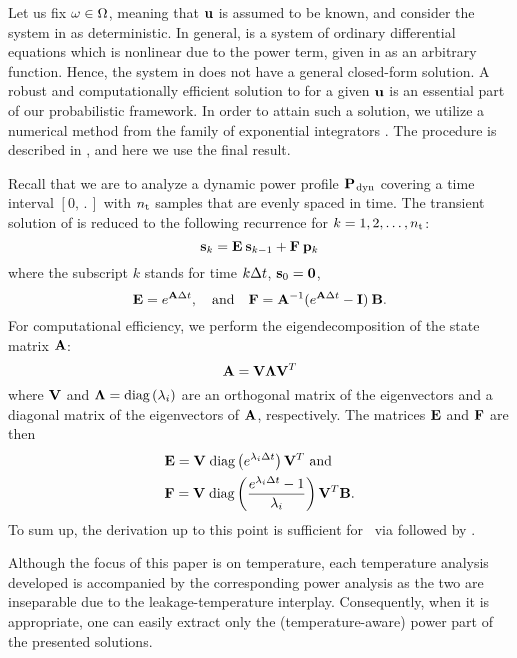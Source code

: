 Let us fix $\omega \in \Omega$, meaning that $\mathbf{u}$ is assumed to be known, and consider the system in  as deterministic.
In general,  is a system of ordinary differential equations which is nonlinear due to the power term, given in  as an arbitrary function.
Hence, the system in  does not have a general closed-form solution.
A robust and computationally efficient solution to  for a given $\mathbf{u}$ is an essential part of our probabilistic framework.
In order to attain such a solution, we utilize a numerical method from the family of exponential integrators \cite{hochbruck2010}.
The procedure is described in , and here we use the final result.

Recall that we are to analyze a dynamic power profile $\mathbf{P}_{\text{\kern0.1emdyn}}$ covering a time interval $[0, \period]$ with ${n_\text{t}}$ samples that are evenly spaced in time.
The transient solution of  is reduced to the following recurrence for $k = 1, 2, \dots, {n_\text{t}}$:
\begin{equation} \elab{recurrence}
  \vs_k = \mE \: \vs_{k - 1} + \mF \: \vp_k
\end{equation}
where the subscript $k$ stands for time $k \Delta t$, $\mathbf{s}_0 = \mathbf{0}$,
\[
  \mathbf{E} = e^{\mathbf{A} \Delta t}, \hspace{1em} \text{and} \hspace{1em} \mathbf{F} = \mathbf{A}^{-1} (e^{\mathbf{A} \Delta t} - \mathbf{I}) \: \mathbf{B}.
\]
For computational efficiency, we perform the eigendecomposition of the state matrix $\mathbf{A}$:
\begin{equation} \elab{eigendecomposition}
  \mA = \mEDV \mEDL \mEDV^T
\end{equation}
where $\mathbf{V}$ and $\mathbf{\Lambda} = \text{diag}\left( \lambda_i \right)$ are an orthogonal matrix of the eigenvectors and a diagonal matrix of the eigenvectors of $\mathbf{A}$, respectively.
The matrices $\mathbf{E}$ and $\mathbf{F}$ are then
\begin{align*}
  & \mathbf{E} = \mathbf{V} \; \text{diag}\left( e^{\lambda_i \Delta t} \right) \mathbf{V}^T \text{ and} \\
  & \mathbf{F} = \mathbf{V} \; \text{diag}\left(  \frac{e^{\lambda_i \Delta t} - 1}{\lambda_i}  \right) \mathbf{V}^T \mathbf{B}.
\end{align*}
To sum up, the derivation up to this point is sufficient for \tta\ via  followed by .
\begin{remark}
Although the focus of this paper is on temperature, each temperature analysis developed is accompanied by the corresponding power analysis as the two are inseparable due to the leakage-temperature interplay.
Consequently, when it is appropriate, one can easily extract only the (temperature-aware) power part of the presented solutions.
\end{remark}

